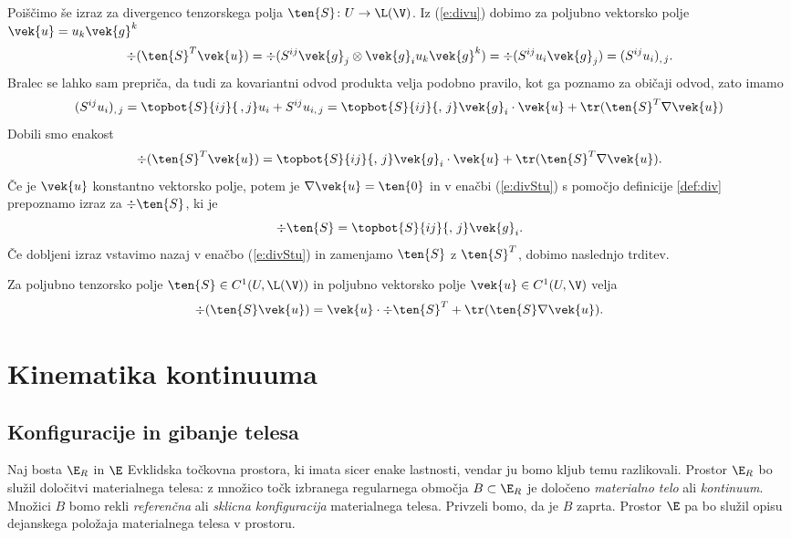 Poiščimo še izraz za divergenco tenzorskega polja $\ten{S}\colon U\to\L(\V)$.
Iz (\ref{e:divu}) dobimo za poljubno vektorsko polje $\vek{u}=u_k\vek{g}^k$
\[
	\div(\ten{S}^{T}\vek{u})=\div(S^{ij}\vek{g}_j\otimes\vek{g}_i u_k\vek{g}^k)
	=\div(S^{ij}u_i\vek{g}_j)=(S^{ij}u_i)_{,\,j}.
\]
Bralec se lahko sam prepriča, da tudi za kovariantni odvod produkta velja
podobno pravilo, kot ga poznamo za običaji odvod, zato imamo
\[
	(S^{ij}u_i)_{,\,j}=\topbot{S}{ij}{\,,j}u_i+S^{ij}u_{i,\,j}=
	\topbot{S}{ij}{,\,j}\vek{g}_i\cdot\vek{u}+\tr(\ten{S}^{T}\nabla\vek{u})
\]
Dobili smo enakost
\begin{equation} \label{e:divStu}
	\div(\ten{S}^{T}\vek{u})=\topbot{S}{ij}{,\,j}\vek{g}_i\cdot\vek{u}+\tr(\ten{S}^{T}\nabla\vek{u}).
\end{equation}
Če je $\vek{u}$ konstantno vektorsko polje, potem je $\nabla\vek{u}=\ten{0}$ in v
enačbi (\ref{e:divStu}) s pomočjo definicije \ref{def:div} prepoznamo izraz za $\div\ten{S}$, ki je
\[
	\div\ten{S}=\topbot{S}{ij}{,\,j}\vek{g}_i.
\]
Če dobljeni izraz vstavimo nazaj v enačbo (\ref{e:divStu}) in zamenjamo $\ten{S}$ z
$\ten{S}^{T}$, dobimo naslednjo trditev.
\begin{trditev} \label{e:divSu}
	Za poljubno tenzorsko polje $\ten{S}\in C^1(U,\L(\V))$ in poljubno
	vektorsko polje $\vek{u}\in C^1(U,\V)$ velja
	\[ \div(\ten{S}\vek{u})=\vek{u}\cdot\div\ten{S}^{T}+\tr(\ten{S}\nabla\vek{u}). \]
\end{trditev}



\section{Kinematika kontinuuma}


\subsection{Konfiguracije in gibanje telesa}


Naj bosta $\E_R$ in $\E$ Evklidska točkovna prostora, ki imata sicer enake lastnosti,
vendar ju bomo kljub temu razlikovali. Prostor $\E_R$ bo služil določitvi materialnega
telesa: z množico točk izbranega regularnega območja $B\subset\E_R$ je določeno \emph{materialno
telo} ali \emph{kontinuum}. Množici $B$ bomo rekli \emph{referenčna} ali \emph{sklicna konfiguracija}
materialnega telesa. Privzeli bomo, da je $B$ zaprta.
Prostor $\E$ pa bo služil opisu dejanskega položaja materialnega telesa v prostoru.

